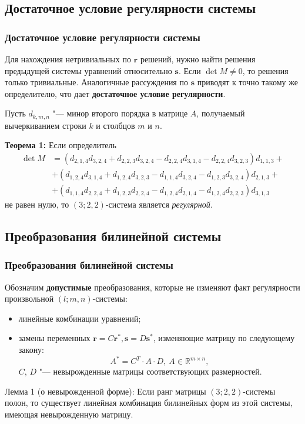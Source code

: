 \documentclass[russian,hyperref={unicode}]{beamer}
\begin{document}
\subsection{Достаточное условие регулярности системы}
\frame
{
	\frametitle{Достаточное условие регулярности системы}
	Для нахождения нетривиальных по $\mathbf{r}$ решений, нужно найти решения предыдущей 
	системы уравнений относительно $\mathbf{s}$. Если $\det M \ne 0$, то решения только 
	тривиальные. Аналогичные рассуждения по $\mathbf{s}$ приводят к точно 
	такому же определителю, что дает \textbf{достаточное условие регулярности}.  
		
	Пусть $d_{k, m, n}$ "--- минор второго порядка в матрице $A$, получаемый 
	вычеркиванием строки $k$ и столбцов $m$ и $n$.
	
	\textbf{Теорема 1:}
	Если определитель 
	\begin{align*}
	 	\det M & = (d_{2,1,4} d_{3,2,4} + d_{2,2,3} d_{3,2,4} - d_{2,2,4} d_{3,1,4} - 
	 	d_{2,2,4} d_{3,2,3}) d_{1,1,3} + \\
	 	& + (d_{1,2,4} d_{3,1,4} + d_{1,2,4} d_{3,2,3} - d_{1,1,4} d_{3,2,4} -	
		d_{1,2,3} d_{3,2,4}) d_{2,1,3} + \\		 
	 	& + (d_{1,1,4} d_{2,2,4} + d_{1,2,3}d_{2,2,4} - d_{1,2,4}d_{2,1,4} - 
		d_{1,2,4} d_{2,2,3}) d_{3,1,3}
	\end{align*} 
	не равен нулю, то $(3; 2, 2)$-система является \textit{регулярной}.
}
\subsection{Преобразования билинейной системы}
\frame
{
	\frametitle{Преобразования билинейной системы}
	Обозначим \textbf{допустимые} преобразования, которые не изменяют факт регулярности 
	произвольной $(l; m, n)$-системы: 
	\begin{itemize}
		\item линейные комбинации уравнений;
		\item замены переменных $
			\mathbf{r} = C \mathbf{r}^*, \mathbf{s} = D \mathbf{s}^* 
		$, изменяющие матрицу по следующему закону: 
		$$
			A^* = C^T \cdot A \cdot D,~A \in \mathbb{R}^{m \times n},
		$$
		$C$, $D$ "--- невырожденные матрицы соответствующих размерностей. 
	\end{itemize}
	\begin{block}{Лемма 1 (о невырожденной форме):}
		Если ранг матрицы $(3; 2,2)$-системы полон, то существует линейная комбинация 
		билинейных форм из этой системы, имеющая невырожденную матрицу.
	\end{block}
}
\end{document}
